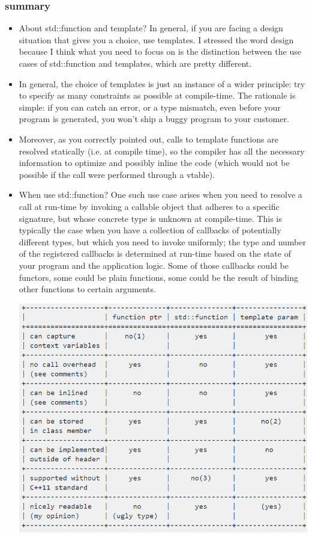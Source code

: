 \documentclass[a4paper,12pt,twoside]{book}
\begin{document}
\subsubsection{summary}
\begin{itemize}
\item About std::function and template? In general, if you are facing a design situation that gives you a choice, use templates. I stressed the word design because I think what you need to focus on is the distinction between the use cases of std::function and templates, which are pretty different.

\item In general, the choice of templates is just an instance of a wider principle: try to specify as many constraints as possible at compile-time. The rationale is simple: if you can catch an error, or a type mismatch, even before your program is generated, you won't ship a buggy program to your customer.

\item Moreover, as you correctly pointed out, calls to template functions are resolved statically (i.e. at compile time), so the compiler has all the necessary information to optimize and possibly inline the code (which would not be possible if the call were performed through a vtable).


\item When use std::function? One such use case arises when you need to resolve a call at run-time by invoking a callable object that adheres to a specific signature, but whose concrete type is unknown at compile-time. This is typically the case when you have a collection of callbacks of potentially different types, but which you need to invoke uniformly; the type and number of the registered callbacks is determined at run-time based on the state of your program and the application logic. Some of those callbacks could be functors, some could be plain functions, some could be the result of binding other functions to certain arguments.

\includegraphics[scale=0.45]{pics/function.png} \newline
\end{itemize}
\end{document}
